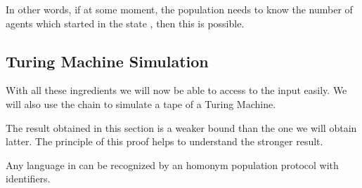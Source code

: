 \documentclass[UKenglish]{llncs}
\begin{document}
\begin{remark}
  In other words, if at some moment, the population needs to know
the number of agents which started in the state , then this is
possible.
\end{remark}

\subsection{Turing Machine Simulation}\label{sec:def}

With all these ingredients we will now be able to access to the input
easily. We will also use the chain to simulate a tape of a
Turing Machine. 


The result obtained in this section  is a weaker bound than the one we will obtain latter. The principle of this proof helps to understand the stronger result.

\begin{proposition}
Any language in  can be recognized by an homonym population
protocol with  identifiers.
\end{proposition}
\end{document}
